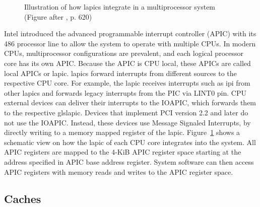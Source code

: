 
\begin{figure}
  \begin{center}
    
    \caption{Illustration of how \glspl{lapic} integrate in a
    multiprocessor system (Figure after \cite{amd_manual}, p. 620)}
    \label{fig:state:technical:lapic}
  \end{center}
\end{figure}

Intel introduced the advanced programmable interrupt controller (APIC)
with its 486 processor line to allow the system to operate with multiple CPUs.
In modern CPUs, multiprocessor configurations are prevalent, and each logical
processor core has its own APIC. Because the APIC is CPU local, these APICs are
called local APICs or \gls{lapic}. \glspl{lapic} forward interrupts from
different sources to the respective CPU core. For example, the \gls{lapic}
receives interrupts such as \gls{ipi} from other \glspl{lapic} and forwards
legacy interrupts from the PIC via LINT0 pin. CPU external devices can deliver
their interrupts to the IOAPIC, which forwards them to the respective
gls{lapic}. Devices that implement PCI version 2.2 and later do not use the
IOAPIC. Instead, these devices use Message Signaled Interrupts, by directly
writing to a memory mapped register of the \gls{lapic}.
Figure~\ref{fig:state:technical:lapic} shows a schematic view on how the
\gls{lapic} of each CPU core integrates into the system. All APIC registers are
mapped to the 4-KiB APIC register space starting at the address specified
in APIC base address register. System software can then access APIC registers
with memory reads and writes to the APIC register space.

\subsection{Caches}
\label{sec:state:technical:caches}

